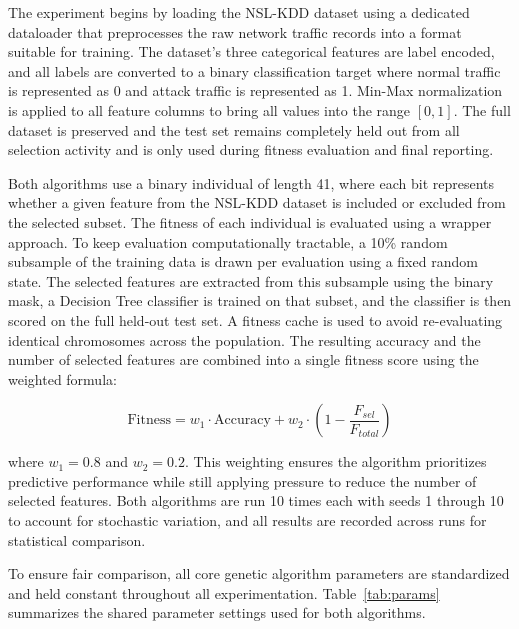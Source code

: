 \documentclass[letterpaper]{article} %
\begin{document}
The experiment begins by loading the NSL-KDD dataset using a dedicated dataloader that preprocesses the raw network traffic records into a format suitable for training. The dataset's three categorical features are label encoded, and all labels are converted to a binary classification target where normal traffic is represented as 0 and attack traffic is represented as 1. Min-Max normalization is applied to all feature columns to bring all values into the range $[0, 1]$. The full dataset is preserved and the test set remains completely held out from all selection activity and is only used during fitness evaluation and final reporting.

Both algorithms use a binary individual of length 41, where each bit represents whether a given feature from the NSL-KDD dataset is included or excluded from the selected subset. The fitness of each individual is evaluated using a wrapper approach. To keep evaluation computationally tractable, a 10\% random subsample of the training data is drawn per evaluation using a fixed random state. The selected features are extracted from this subsample using the binary mask, a Decision Tree classifier is trained on that subset, and the classifier is then scored on the full held-out test set. A fitness cache is used to avoid re-evaluating identical chromosomes across the population. The resulting accuracy and the number of selected features are combined into a single fitness score using the weighted formula:

\begin{equation}
    \mathrm{Fitness} = w_1 \cdot \mathrm{Accuracy} + w_2 \cdot \left(1 - \frac{F_{sel}}{F_{total}}\right)
\end{equation}

where $w_1 = 0.8$ and $w_2 = 0.2$. This weighting ensures the algorithm prioritizes predictive performance while still applying pressure to reduce the number of selected features. Both algorithms are run 10 times each with seeds 1 through 10 to account for stochastic variation, and all results are recorded across runs for statistical comparison.

To ensure fair comparison, all core genetic algorithm parameters are standardized and held constant throughout all experimentation. Table~\ref{tab:params} summarizes the shared parameter settings used for both algorithms.
\end{document}
